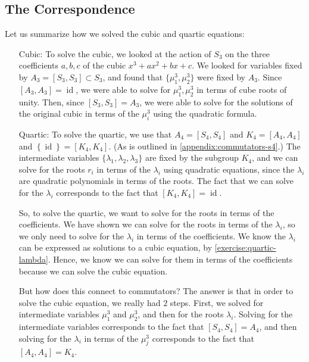 \documentclass[reqno, 12pt, letter]{article}
\theoremstyle{plain}
\theoremstyle{definition}
\theoremstyle{remark}
\numberwithin{equation}{section}
\DeclareMathOperator\id{id}
\begin{document}
			
			
		
		
		
		
		\newpage
		\subsection{The Correspondence}
		Let us summarize how we solved the cubic and quartic equations:		
		\begin{enumerate}
			\item[Cubic:] To solve the cubic, we looked at the action of $S_3$ on the three coefficients $a,b,c$ of the cubic $x^3 + ax^2 + bx+c$. 
				We looked for variables fixed by $A_3 = \left[ S_3, S_3 \right] \subset S_3$,
				and found that $\{\mu_1^3, \mu_2^3 \}$ were fixed by $A_3$.
				Since $\left[ A_3, A_3 \right]= \id$, we were able to solve for $\mu_1^3, \mu_2^3$ in terms of cube roots of unity.
				Then, since $\left[ S_3, S_3 \right]=A_3$,
				we were able to solve for the solutions of the original cubic in terms of the $\mu_i^3$ using the quadratic formula.
			\item[Quartic:]	
				To solve the quartic, we use that $A_4 = \left[ S_4, S_4 \right]$ and $K_4 = \left[ A_4, A_4 \right]$ and
				$\left\{ \id \right\}= \left[ K_4, K_4 \right]$.
				(As is outlined in \autoref{appendix:commutators-s4}.)
				The intermediate variables $ \{\lambda_1, \lambda_2, \lambda_3 \}$ are fixed by the subgroup $K_4$,
				and 
				we can solve for the roots $r_i$ in terms of the $\lambda_i$
				using quadratic equations, since the $\lambda_i$ are quadratic polynomials in terms of the roots.
				The fact that we can solve for the $\lambda_i$ corresponds to the fact that $\left[ K_4, K_4 \right] = \id$.

				So, to solve the quartic, we want to solve for the roots in terms of the coefficients.
				We have shown we can solve for the roots in terms of the $\lambda_i$, so we only need to solve
				for the $\lambda_i$ in terms of the coefficients.
				We know the $\lambda_i$ can be expressed as solutions to a cubic equation, by \autoref{exercise:quartic-lambda}.
				Hence, we know we can solve for them in terms of the coefficients because we can solve the cubic equation.

				But how does this connect to commutators?
				The answer is that in order to solve the cubic equation, we really had $2$ steps.
				First, we solved for intermediate variables
				$\mu_1^3$ and $\mu_2^3$, and then for the roots $\lambda_i$.
				Solving for the intermediate variables corresponds to the fact that $\left[ S_4, S_4 \right] = A_4$,
				and then solving for the $\lambda_i$ in terms of the $\mu_j^3$ corresponds to the fact that
				$\left[ A_4, A_4 \right] = K_4$.
		\end{enumerate}
		
\end{document}
